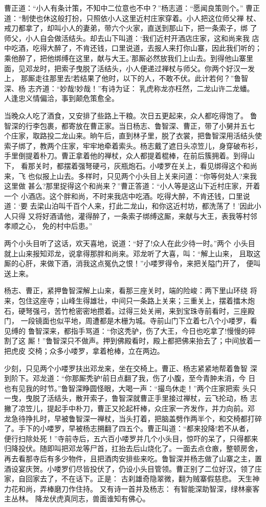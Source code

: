 曹正道：“小人有条计策，不知中二位意也不中？”杨志道：“愿闻良策则个。”
曹正道：“制使也休这般打扮，只照依小人这里近村庄家穿着。小人把这位师父禅
杖、戒刀都拿了，却叫小人的妻弟，带六个火家，直送到那山下，把一条索子，绑
了师父，小人自会做活结头。却去山下叫道：‘我们近村开酒店庄家，这和尚来我
店中吃酒，吃得大醉了，不肯还钱，口里说道，去报人来打你山寨，因此我们听的；
乘他醉了，把他绑缚在这里，献与大王。’那厮必然放我们上山去。到得他山寨里
面，见邓龙时，把索子曳脱了活结头，小人便递过禅杖与师父。你两个好汉一发上，
那厮走往那里去!若结果了他时，以下的人，不敢不伏。此计若何？”鲁智深、杨
志齐道：“妙哉!妙哉！”有诗为证：
乳虎称龙亦枉然，二龙山许二龙蟠。
人逢忠义情偏洽，事到颠危策愈全。

当晚众人吃了酒食，又安排了些路上干粮。次日五更起来，众人都吃得饱了。
鲁智深的行李包裹，都寄放在曹正家。当日杨志、鲁智深、曹正，带了小舅并五七
个庄家，取路投二龙山来。晌午后，直到林子里，脱了衣裳，把鲁智深用活结头使
索子绑了，教两个庄家，牢牢地牵着索头。杨志戴了遮日头凉笠儿，身穿破布衫，
手里倒提着朴刀。曹正拿着他的禅杖，众人都提着棍棒，在前后簇拥着。到得山下，
看那关时，都摆着强弩硬弓，灰瓶炮石。小喽罗在关上，看见绑得这个和尚来，飞
也似报上山去。多样时，只见两个小头目上关来问道：“你等何处人?来我这里做
甚么?那里捉得这个和尚来？”曹正答道：“小人等是这山下近村庄家，开着一个
小酒店。这个胖和尚，不时来我店中吃酒。吃得大醉，不肯还钱，口里说道：‘要
去梁山泊叫千百个人来，打此二龙山，和你这近村坊，都洗荡了！’因此小人只得
又将好酒请他，灌得醉了，一条索子绑缚这厮，来献与大王，表我等村邻孝顺之心，
免的村中后患。”

两个小头目听了这话，欢天喜地，说道：“好了!众人在此少待一时。”两个
小头目就上山来报知邓龙，说拿得那胖和尚来。邓龙听了大喜，叫：“解上山来，
且取这厮的心肝，来做下酒，消我这点冤仇之恨！”小喽罗得令，来把关隘门开了，
便叫送上来。

杨志、曹正，紧押鲁智深解上山来，看那三座关时，端的险峻：两下里山环绕
将来，包住这座寺；山峰生得雄壮，中间只一条路上关来；三重关上，摆着擂木炮
石，硬弩强弓，苦竹枪密密地攒着。过得三处关闸，来到宝珠寺前看时，三座殿门，
一段镜面也似平地，周遭都是木栅为城。寺前山门下立着七八个小喽罗，看见缚的
鲁智深来，都指手骂道：“你这秃驴，伤了大王，今日也吃拿了!慢慢的碎割了这
厮！”鲁智深只不做声。押到佛殿看时，殿上都把佛来抬去了；中间放着一把虎皮
交椅；众多小喽罗，拿着枪棒，立在两边。

少刻，只见两个小喽罗扶出邓龙来，坐在交椅上。曹正、杨志紧紧地帮着鲁智
深到阶下。邓龙道：“你那厮秃驴!前日点翻了我，伤了小腹，至今青肿未消，今
日也有见我的时节。”鲁智深睁圆怪眼，大喝一声：“撮鸟休走！”两个庄家把索
头只一曳，曳脱了活结头，散开索子，鲁智深就曹正手里接过禅杖，云飞抡动，杨
志撇了凉笠儿，提起手中朴刀，曹正又抡起杆棒，众庄家一齐发作，并力向前。邓
龙急待挣扎时，早被鲁智深一禅杖，当头打着，把脑盖劈作两半个，和交椅都打碎
了。手下的小喽罗，早被杨志搠翻了四五个。曹正叫道：“都来投降!若不从者，
便行扫除处死！”寺前寺后，五六百小喽罗并几个小头目，惊吓的呆了，只得都来
归降投伏。随即叫把邓龙等尸首，扛抬去后山烧化了。一面去点仓廒，整顿房舍，
再去看那寺后有多少物件，且把酒肉安排些来吃。鲁智深并杨志做了山寨之主，置
酒设宴庆贺。小喽罗们尽皆投伏了，仍设小头目管领。曹正别了二位好汉，领了庄
家，自回家去了，不在话下。正是：
古刹雄奇隐翠微，翻为贼寨假慈悲。
天生神力花和尚，弄棒磨刀作住持。
又有诗一首并及杨志：
有智能深助智深，绿林豪客主丛林。
降龙伏虎真同志，兽面谁知有佛心。

